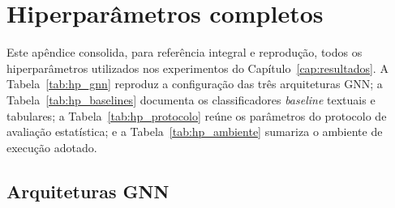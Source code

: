 \chapter{Hiperpar\^ametros completos}
\label{ap:hiperparametros}

Este ap\^endice consolida, para refer\^encia integral e reprodu\c{c}\~ao,
todos os hiperpar\^ametros utilizados nos experimentos do
Cap\'itulo~\ref{cap:resultados}. A Tabela~\ref{tab:hp_gnn} reproduz a
configura\c{c}\~ao das tr\^es arquiteturas GNN; a Tabela~\ref{tab:hp_baselines}
documenta os classificadores \emph{baseline} textuais e tabulares; a
Tabela~\ref{tab:hp_protocolo} re\'une os par\^ametros do protocolo de
avalia\c{c}\~ao estat\'istica; e a Tabela~\ref{tab:hp_ambiente} sumariza
o ambiente de execu\c{c}\~ao adotado.

\section{Arquiteturas GNN}
\label{sec:hp_gnn}

